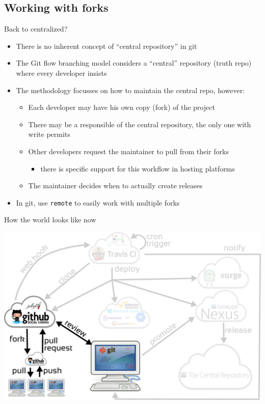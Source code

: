 \documentclass[presentation]{beamer}
\begin{document}
\subsection{Working with forks}

\begin{frame}[fragile]{Back to centralized?}
	\begin{itemize}
		\item There is no inherent concept of ``central repository'' in git
		\item The Git flow branching model considers a ``central'' repository (truth repo) where every developer insists
		\item The methodology focusses on how to maintain the central repo, however:
		\begin{itemize}
			\item Each developer may have his own copy (fork) of the project
			\item There may be a responsible of the central repository, the only one with write permits
			\item Other developers request the maintainer to pull from their forks
			\begin{itemize}
				\item there is specific support for this workflow in hosting platforms
			\end{itemize}
			\item The maintainer decides when to actually create releases
		\end{itemize}
		\item In git, use \texttt{remote} to easily work with multiple forks
	\end{itemize}
\end{frame}

\begin{frame}[fragile]{How the world looks like now}
	\begin{center}
		\includegraphics[width=.9\textwidth]{images/ci-fork}
	\end{center}
\end{frame}
\end{document}

